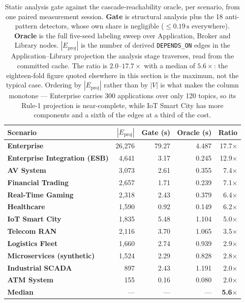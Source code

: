 \documentclass[preprint,3p]{elsarticle}
\begin{document}
\begin{table}[htbp]
\centering
\small
\caption{Static analysis gate against the cascade-reachability oracle, per scenario, from one paired measurement session. \textbf{Gate} is structural analysis plus the 18 anti-pattern detectors, whose own share is negligible ($\le 0.19\,\text{s}$ everywhere). \textbf{Oracle} is the full five-seed labeling sweep over Application, Broker and Library nodes. $|E_{\text{proj}}|$ is the number of derived \texttt{DEPENDS\_ON} edges in the Application--Library projection the analysis stage traverses, read from the committed cache. The ratio is $2.0$--$17.7\times$ with a median of $5.6\times$: the eighteen-fold figure quoted elsewhere in this section is the maximum, not the typical case. Ordering by $|E_{\text{proj}}|$ rather than by $|V|$ is what makes the column monotone --- Enterprise carries 300 applications over only 120 topics, so its Rule-1 projection is near-complete, while IoT Smart City has more components and a sixth of the edges at a third of the cost.}
\label{tab:gate_ratio}
\begin{tabular}{lrrrr}
\toprule
\textbf{Scenario} & \textbf{$|E_{\text{proj}}|$} & \textbf{Gate (s)} & \textbf{Oracle (s)} & \textbf{Ratio} \\
\midrule
\textbf{Enterprise} & 26{,}276 & 79.27 & 4.487 & 17.7$\times$ \\
\textbf{Enterprise Integration (ESB)} & 4{,}641 & 3.17 & 0.245 & 12.9$\times$ \\
\textbf{AV System} & 3{,}073 & 2.61 & 0.355 & 7.4$\times$ \\
\textbf{Financial Trading} & 2{,}657 & 1.71 & 0.239 & 7.1$\times$ \\
\textbf{Real-Time Gaming} & 2{,}318 & 2.43 & 0.379 & 6.4$\times$ \\
\textbf{Healthcare} & 1{,}590 & 0.92 & 0.149 & 6.2$\times$ \\
\textbf{IoT Smart City} & 1{,}835 & 5.48 & 1.104 & 5.0$\times$ \\
\textbf{Telecom RAN} & 2{,}116 & 3.70 & 1.065 & 3.5$\times$ \\
\textbf{Logistics Fleet} & 1{,}660 & 2.74 & 0.939 & 2.9$\times$ \\
\textbf{Microservices (synthetic)} & 1{,}524 & 2.29 & 0.828 & 2.8$\times$ \\
\textbf{Industrial SCADA} & 897 & 2.43 & 1.191 & 2.0$\times$ \\
\textbf{ATM System} & 155 & 0.16 & 0.080 & 2.0$\times$ \\
\midrule
\textbf{Median} & — & — & — & \textbf{5.6$\times$} \\
\bottomrule
\end{tabular}
\end{table}
\end{document}
